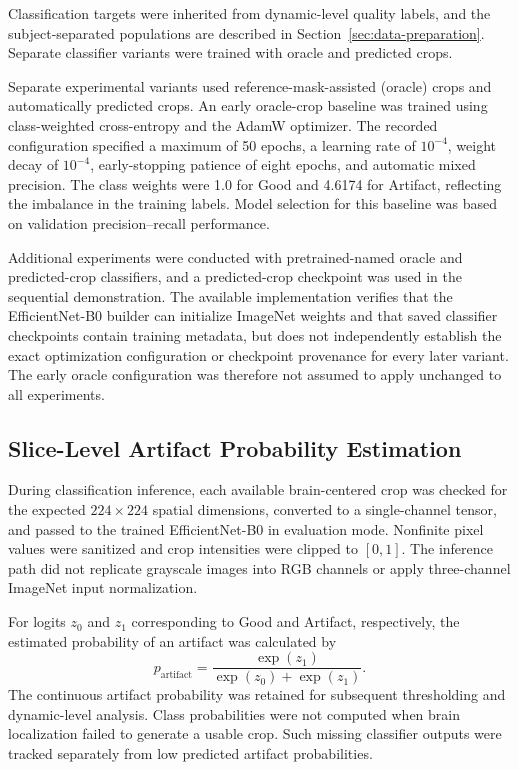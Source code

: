 Classification targets were inherited from dynamic-level quality labels, and the subject-separated populations are described in Section~\ref{sec:data-preparation}. Separate classifier variants were trained with oracle and predicted crops.

Separate experimental variants used reference-mask-assisted (oracle) crops and automatically predicted crops. An early oracle-crop baseline was trained using class-weighted cross-entropy and the AdamW optimizer. The recorded configuration specified a maximum of 50 epochs, a learning rate of $10^{-4}$, weight decay of $10^{-4}$, early-stopping patience of eight epochs, and automatic mixed precision. The class weights were 1.0 for Good and 4.6174 for Artifact, reflecting the imbalance in the training labels. Model selection for this baseline was based on validation precision--recall performance.

Additional experiments were conducted with pretrained-named oracle and predicted-crop classifiers, and a predicted-crop checkpoint was used in the sequential demonstration. The available implementation verifies that the EfficientNet-B0 builder can initialize ImageNet weights and that saved classifier checkpoints contain training metadata, but does not independently establish the exact optimization configuration or checkpoint provenance for every later variant. The early oracle configuration was therefore not assumed to apply unchanged to all experiments.

\subsection{Slice-Level Artifact Probability Estimation}
\label{subsec:2d_slice_probability}

During classification inference, each available brain-centered crop was checked for the expected $224\times224$ spatial dimensions, converted to a single-channel tensor, and passed to the trained EfficientNet-B0 in evaluation mode. Nonfinite pixel values were sanitized and crop intensities were clipped to $[0,1]$. The inference path did not replicate grayscale images into RGB channels or apply three-channel ImageNet input normalization.

For logits $z_0$ and $z_1$ corresponding to Good and Artifact, respectively, the estimated probability of an artifact was calculated by
\begin{equation}
p_{\mathrm{artifact}}=
\frac{\exp(z_1)}{\exp(z_0)+\exp(z_1)}.
\end{equation}
The continuous artifact probability was retained for subsequent thresholding and dynamic-level analysis. Class probabilities were not computed when brain localization failed to generate a usable crop. Such missing classifier outputs were tracked separately from low predicted artifact probabilities.

